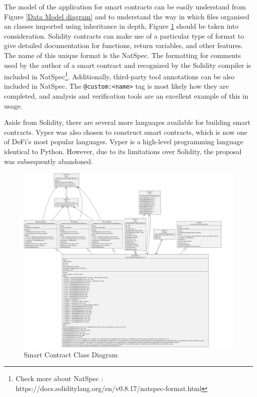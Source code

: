 \vspace{.5cm}

The model of the application for smart contracts can be easily understand from Figure \ref{Data Model diagram} and to understand the way in which files organised an classes imported using inheritance in depth, Figure \ref{Overall Class Diagram} should be taken into consideration. Solidity contracts can make use of a particular type of format to give detailed documentation for functions, return variables, and other features. The name of this unique format is the \ac{NatSpec}. The formatting for comments used by the author of a smart contract and recognized by the Solidity compiler is included in \ac{NatSpec}\footnote{Check more about NatSpec : https://docs.soliditylang.org/en/v0.8.17/natspec-format.html}. Additionally, third-party tool annotations can be also included in \ac{NatSpec}. The \texttt{@custom:<name>} tag is most likely how they are completed, and analysis and verification tools are an excellent example of this in usage.

\vspace{.5cm}

Aside from Solidity, there are several more languages available for building smart contracts. Vyper was also chosen to construct smart contracts, which is now one of \ac{DeFi}'s most popular languages. Vyper is a high-level programming language identical to Python. However, due to its limitations over Solidity, the proposal was subsequently abandoned.

\begin{figure}[h!]
\centering
  \includegraphics[width=21cm, angle=90]{includes/figures/OverallClassDiagram.png} 
  \caption{Smart Contract Class Diagram}
  \label{Overall Class Diagram}
\end{figure}

